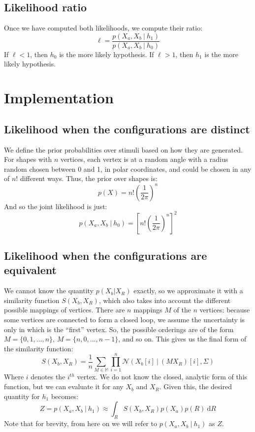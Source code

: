 \documentclass{article} %
\begin{document}
\subsection{Likelihood ratio}

Once we have computed both likelihoods, we compute their ratio:
\begin{equation}
  \ell=\frac{p(X_a, X_b\ \vert \ h_1)}{p(X_a, X_b\ \vert \ h_0)}
\end{equation} 
If $\ell<1$, then $h_0$ is the more likely hypothesis. If $\ell>1$,
then $h_1$ is the more likely hypothesis.

\section{Implementation}

\subsection{Likelihood when the configurations are distinct}

We define the prior probabilities over stimuli based on how they are
generated. For shapes with $n$ vertices, each vertex is at a random
angle with a radius random chosen between 0 and 1, in polar
coordinates, and could be chosen in any of $n!$ different ways. Thus,
the prior over shapes is:
\begin{equation}
  p(X)=n!\left(\frac{1}{2\pi}\right)^n
\end{equation} 
And so the joint likelihood is just:
\begin{equation}
  p(X_a, X_b\ \vert \ h_0)=\left[n!\left(\frac{1}{2\pi}\right)^n\right]^2
\end{equation}

\subsection{Likelihood when the configurations are equivalent}

We cannot know the quantity $p(X_b\vert X_R)$ exactly, so we
approximate it with a similarity function $S(X_b, X_R)$, which also
takes into account the different possible mappings of vertices. There
are $n$ mappings $M$ of the $n$ vertices: because some vertices are
connected to form a closed loop, we assume the uncertainty is only in
which is the ``first'' vertex. So, the possible orderings are of the
form $M=\lbrace{}0, 1, \ldots{}, n\rbrace{}$, $M=\lbrace{}n, 0,
\ldots{}, n-1\rbrace{}$, and so on. This gives us the final form of
the similarity function:
\begin{equation}
  S(X_b, X_R)=\frac{1}{n}\sum_{M\in\mathbb{M}}\prod_{i=1}^n\mathcal{N}(X_b[i]\ \vert \ (MX_R)[i], \Sigma)
\end{equation}
Where $i$ denotes the $i^{th}$ vertex. We do not know the closed,
analytic form of this function, but we can evaluate it for any $X_b$
and $X_R$. Given this, the desired quantity for $h_1$ becomes:
\begin{equation}
  Z = p(X_a,X_b\ \vert \ h_1)\approx \int_R S(X_b, X_R)p(X_a)p(R)\ \mathrm{d}R
\end{equation}
Note that for brevity, from here on we will refer to $p(X_a, X_b\
\vert \ h_1)$ as $Z$.
\end{document}
